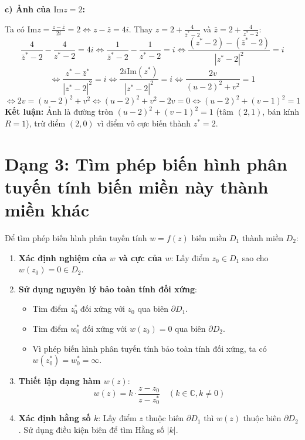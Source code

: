 \documentclass[12pt,a4paper]{article}
\begin{document}
\bigskip
\noindent \textbf{c) Ảnh của $\text{Im}z = 2$:}

Ta có $\text{Im}z = \frac{z - \bar{z}}{2i} = 2 \iff z - \bar{z} = 4i$. Thay $z = 2 + \frac{4}{\bar{z}^* - 2}$ và $\bar{z} = 2 + \frac{4}{z^* - 2}$:
\[ \frac{4}{\bar{z}^* - 2} - \frac{4}{z^* - 2} = 4i \iff \frac{1}{\bar{z}^* - 2} - \frac{1}{z^* - 2} = i \iff \frac{(z^* - 2) - (\bar{z}^* - 2)}{|z^* - 2|^2} = i \]
\[ \iff \frac{z^* - \bar{z}^*}{|z^* - 2|^2} = i \iff \frac{2i \text{Im}(z^*)}{|z^* - 2|^2} = i \iff \frac{2v}{(u - 2)^2 + v^2} = 1 \]
\[ \iff 2v = (u - 2)^2 + v^2 \iff (u - 2)^2 + v^2 - 2v = 0 \iff (u - 2)^2 + (v - 1)^2 = 1 \]
\textbf{Kết luận:} Ảnh là đường tròn $(u - 2)^2 + (v - 1)^2 = 1$ (tâm $(2, 1)$, bán kính $R = 1$), trừ điểm $(2, 0)$ vì điểm vô cực biến thành $z^* = 2$.

\newpage
\section{Dạng 3: Tìm phép biến hình phân tuyến tính biến miền này thành miền khác}

\begin{tcolorbox}[title=Phương pháp tìm phép biến hình phân tuyến tính]
Để tìm phép biến hình phân tuyến tính $w = f(z)$ biến miền $D_1$ thành miền $D_2$:
\begin{enumerate}
    \item \textbf{Xác định nghiệm của $w$ và cực của $w$}:
    Lấy điểm $z_0 \in D_1$ sao cho $w(z_0) = 0 \in D_2$.
    \item \textbf{Sử dụng nguyên lý bảo toàn tính đối xứng}:
    \begin{itemize}
        \item Tìm điểm $z_0^*$ đối xứng với $z_0$ qua biên $\partial D_1$.
        \item Tìm điểm $w_0^*$ đối xứng với $w(z_0) = 0$ qua biên $\partial D_2$.
        \item Vì phép biến hình phân tuyến tính bảo toàn tính đối xứng, ta có $w(z_0^*) = w_0^* = \infty$.
    \end{itemize}
    \item \textbf{Thiết lập dạng hàm $w(z)$}:
    \[ w(z) = k \cdot \frac{z - z_0}{z - z_0^*} \quad (k \in \mathbb{C}, k \neq 0) \]
    \item \textbf{Xác định hằng số $k$}:
    Lấy điểm $z$ thuộc biên $\partial D_1$ thì $w(z)$ thuộc biên $\partial D_2$. Sử dụng điều kiện biên để tìm Hằng số $|k|$.
\end{enumerate}
\end{tcolorbox}
\end{document}
